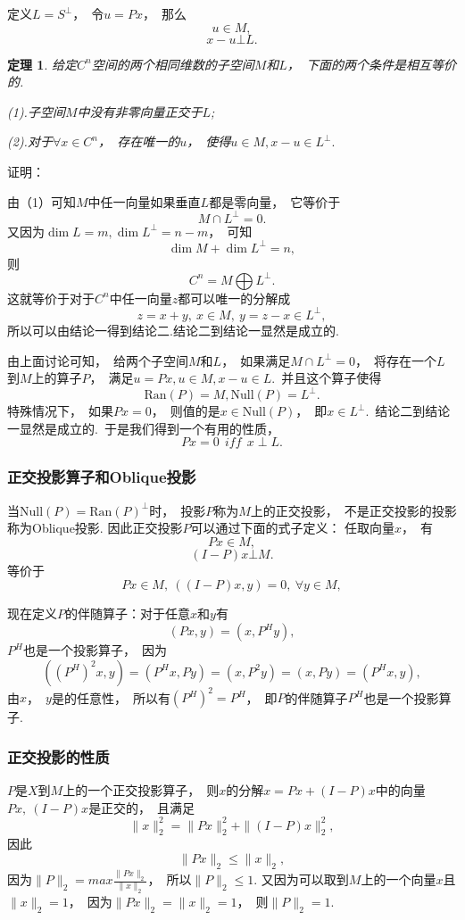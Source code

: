 \documentclass{article}
\newcommand{\Null}{\text{Null}}
\newcommand{\Ran}{\text{Ran}}
\begin{document}
定义$L=S^\bot$，~令$u=Px$，~那么
$$u\in M,$$
$$x-u\bot L.$$

\newtheorem{thm}{定理}
\begin{thm}
给定$C^n$空间的两个相同维数的子空间$M$和$L$，~下面的两个条件是相互等价的.

(1).子空间$M$中没有非零向量正交于$L$;

(2).对于$\forall x\in C^n$，~存在唯一的$u$，~使得$u\in M,x-u\in L^\bot.$
\end{thm}
证明：

由（1）可知$M$中任一向量如果垂直$L$都是零向量，~它等价于
$$M\cap L^\perp={0}.$$
又因为$\dim L=m,\dim L^\perp=n-m$，~可知
$$\dim M+\dim L^\perp=n,$$
则
$$C^n=M\bigoplus L^\perp.$$
这就等价于对于$C^n$中任一向量$z$都可以唯一的分解成
$$z=x+y,~x\in M,~y=z-x \in L^\perp,$$
所以可以由结论一得到结论二.结论二到结论一显然是成立的.

由上面讨论可知，~给两个子空间$M$和$L$，~如果满足$M\cap L^\perp={0}$，~将存在一个$L$到$M$上的算子$P$，~满足$u=Px,u\in M,x-u\in L$.~并且这个算子使得
$$\Ran(P)=M,\Null(P)=L^\perp.$$
特殊情况下，~如果$Px=0$，~则值的是$x\in \Null(P)$，~即$x \in L^\perp$.~结论二到结论一显然是成立的.~于是我们得到一个有用的性质，
$$Px=0~~iff~~x\perp L. $$


\subsubsection{正交投影算子和Oblique投影}
\begin{definition}
当$\Null(P)=\Ran(P)^\bot$时，~投影$P$称为$M$上的正交投影，~不是正交投影的投影称为Oblique投影.
因此正交投影$P$可以通过下面的式子定义：
任取向量$x$，~有
$$Px\in M,$$
$$(I-P)x\bot M.$$
等价于
$$Px\in M,\ ((I-P)x,y)=0,\ \forall y\in M,$$
\end{definition}
现在定义$P$的伴随算子：对于任意$x$和$y$有
$$(Px,y)=(x,P^Hy),$$
$P^H$也是一个投影算子，~因为$$((P^H)^2x,y)=(P^Hx,Py)=(x,P^2y)=(x,Py)=(P^Hx,y),$$
由$x$，~$y$是的任意性，~所以有$(P^H)^2=P^H$，~即$P$的伴随算子$P^H$也是一个投影算子.

\subsubsection{正交投影的性质}
$P$是$X$到$M$上的一个正交投影算子，~则$x$的分解$x=Px+(I-P)x$中的向量$Px,\ (I-P)x$是正交的，~且满足
$$\parallel x\parallel _2^2=\parallel Px\parallel _2^2+\parallel (I-P)x\parallel _2^2,$$
因此
$$\parallel Px\parallel _2\le \parallel x\parallel_2,$$
因为$\parallel P\parallel _2=max\frac{\parallel Px\parallel _2}{\parallel x\parallel _2}$，~所以$\parallel P\parallel _2\le 1.$
又因为可以取到$M$上的一个向量$x$且$\parallel x\parallel _2=1$，~因为$\parallel Px\parallel _2=\parallel x\parallel _2=1$，~则$\parallel P\parallel _2=1$.
\end{document}
